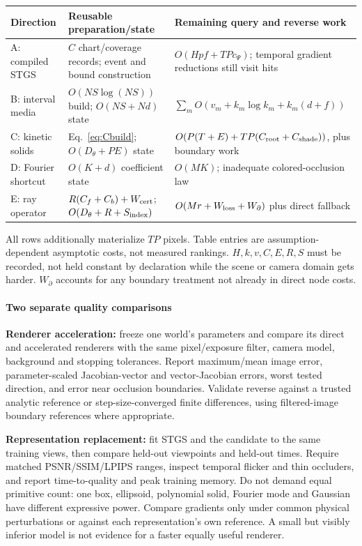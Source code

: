 \documentclass[11pt,letterpaper]{article}
\newcommand{\mini}[1]{\paragraph{#1}}
\begin{document}
\begin{center}\small
\begin{tabularx}{\linewidth}{@{}lXX@{}}
\toprule
Direction & Reusable preparation/state & Remaining query and reverse work \\
\midrule
A: compiled STGS & $C$ chart/coverage records; event and bound construction & $O(Hpf+TPc_\Psi)$; temporal gradient reductions still visit hits \\
B: interval media & $O(NS\log(NS))$ build; $O(NS+Nd)$ state & $\sum_m O(v_m+k_m\log k_m+k_m(d+f))$ \\
C: kinetic solids & Eq.\ \eqref{eq:Cbuild}; $O(D_\theta+PE)$ state & $O(P(T+E)+TP(C_{\rm root}+C_{\rm shade}))$, plus boundary work \\
D: Fourier shortcut & $O(K+d)$ coefficient state & $O(MK)$; inadequate colored-occlusion law \\
E: ray operator & $R(C_f+C_b)+W_{\rm cert}$; $O(D_\theta+R+S_{\rm index})$ & $O(Mr+W_{\rm loss}+W_\partial)$ plus direct fallback \\
\bottomrule
\end{tabularx}
\end{center}
All rows additionally materialize $TP$ pixels. Table entries are assumption-dependent asymptotic costs, not measured rankings. $H,k,v,C,E,R,S$ must be recorded, not held constant by declaration while the scene or camera domain gets harder. $W_\partial$ accounts for any boundary treatment not already in direct node costs.

\mini{Two separate quality comparisons}
\textbf{Renderer acceleration:} freeze one world's parameters and compare its direct and accelerated renderers with the same pixel/exposure filter, camera model, background and stopping tolerances. Report maximum/mean image error, parameter-scaled Jacobian-vector and vector-Jacobian errors, worst tested direction, and error near occlusion boundaries. Validate reverse against a trusted analytic reference or step-size-converged finite differences, using filtered-image boundary references where appropriate.

\textbf{Representation replacement:} fit STGS and the candidate to the same training views, then compare held-out viewpoints and held-out times. Require matched PSNR/SSIM/LPIPS ranges, inspect temporal flicker and thin occluders, and report time-to-quality and peak training memory. Do not demand equal primitive count: one box, ellipsoid, polynomial solid, Fourier mode and Gaussian have different expressive power. Compare gradients only under common physical perturbations or against each representation's own reference. A small but visibly inferior model is not evidence for a faster equally useful renderer.
\end{document}
